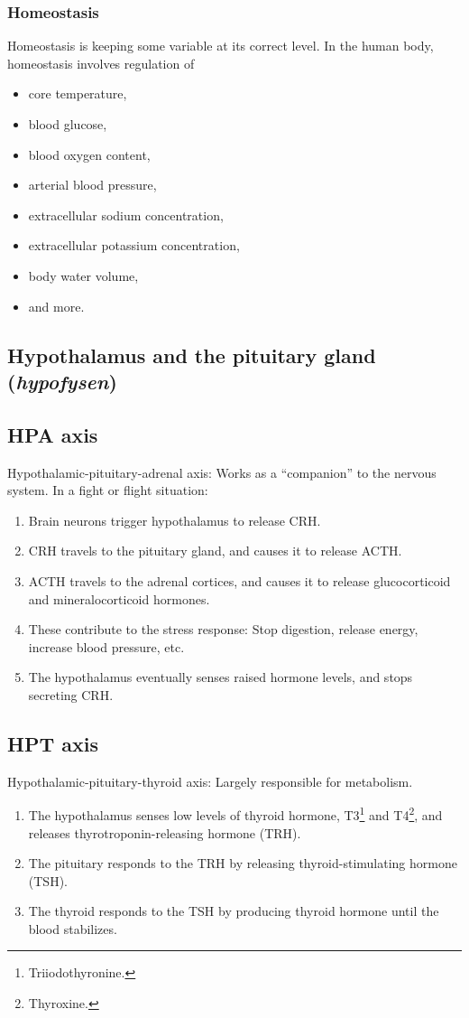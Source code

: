 \subsubsection{Homeostasis}
Homeostasis is keeping some variable at its correct level. In the human body, homeostasis involves regulation of
\begin{itemize}
  \item core temperature,
  \item blood glucose,
  \item blood oxygen content,
  \item arterial blood pressure,
  \item extracellular sodium concentration,
  \item extracellular potassium concentration,
  \item body water volume,
  \item and more.
\end{itemize}

\subsection{Hypothalamus and the pituitary gland (\emph{hypofysen})}

\subsection{HPA axis}
Hypothalamic-pituitary-adrenal axis: Works as a ``companion'' to the nervous system. In a fight or flight situation:
\begin{enumerate}
  \item Brain neurons trigger hypothalamus to release CRH.
  \item CRH travels to the pituitary gland, and causes it to release ACTH.
  \item ACTH travels to the adrenal cortices, and causes it to release glucocorticoid and mineralocorticoid hormones.
  \item These contribute to the stress response: Stop digestion, release energy, increase blood pressure, etc.
  \item The hypothalamus eventually senses raised hormone levels, and stops secreting CRH.
\end{enumerate}

\subsection{HPT axis}
Hypothalamic-pituitary-thyroid axis: Largely responsible for metabolism.
\begin{enumerate}
  \item The hypothalamus senses low levels of thyroid hormone, T3\footnote{Triiodothyronine.} and T4\footnote{Thyroxine.}, and releases  thyrotroponin-releasing hormone (TRH).
  \item The pituitary responds to the TRH by releasing thyroid-stimulating hormone (TSH).
  \item The thyroid responds to the TSH by producing thyroid hormone until the blood stabilizes.
\end{enumerate}

